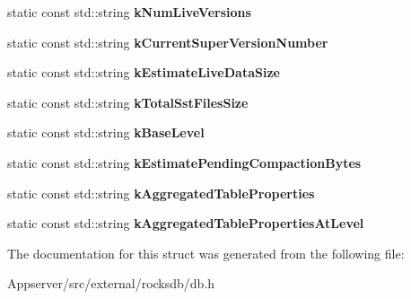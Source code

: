 \begin{DoxyCompactItemize}
\item 
static const std\+::string {\bfseries k\+Num\+Live\+Versions}\hypertarget{structrocksdb_1_1DB_1_1Properties_af9bf762044587e07ea3f48f973089a61}{}\label{structrocksdb_1_1DB_1_1Properties_af9bf762044587e07ea3f48f973089a61}

\item 
static const std\+::string {\bfseries k\+Current\+Super\+Version\+Number}\hypertarget{structrocksdb_1_1DB_1_1Properties_a11d95a8c34935217a56ba81daa015b16}{}\label{structrocksdb_1_1DB_1_1Properties_a11d95a8c34935217a56ba81daa015b16}

\item 
static const std\+::string {\bfseries k\+Estimate\+Live\+Data\+Size}\hypertarget{structrocksdb_1_1DB_1_1Properties_a891ba40a43771067adea93591d3bed46}{}\label{structrocksdb_1_1DB_1_1Properties_a891ba40a43771067adea93591d3bed46}

\item 
static const std\+::string {\bfseries k\+Total\+Sst\+Files\+Size}\hypertarget{structrocksdb_1_1DB_1_1Properties_a1754317492b469699a2aec849791aaab}{}\label{structrocksdb_1_1DB_1_1Properties_a1754317492b469699a2aec849791aaab}

\item 
static const std\+::string {\bfseries k\+Base\+Level}\hypertarget{structrocksdb_1_1DB_1_1Properties_a5168fb4704c9615855f00e278bcc4f41}{}\label{structrocksdb_1_1DB_1_1Properties_a5168fb4704c9615855f00e278bcc4f41}

\item 
static const std\+::string {\bfseries k\+Estimate\+Pending\+Compaction\+Bytes}\hypertarget{structrocksdb_1_1DB_1_1Properties_a3e0f31b77f9d37912725af7e1c22b2bf}{}\label{structrocksdb_1_1DB_1_1Properties_a3e0f31b77f9d37912725af7e1c22b2bf}

\item 
static const std\+::string {\bfseries k\+Aggregated\+Table\+Properties}\hypertarget{structrocksdb_1_1DB_1_1Properties_ab431ed4ab2413b32f09a2511fd8d25a7}{}\label{structrocksdb_1_1DB_1_1Properties_ab431ed4ab2413b32f09a2511fd8d25a7}

\item 
static const std\+::string {\bfseries k\+Aggregated\+Table\+Properties\+At\+Level}\hypertarget{structrocksdb_1_1DB_1_1Properties_a851d4c3de94417af2e9a1c0a59716abe}{}\label{structrocksdb_1_1DB_1_1Properties_a851d4c3de94417af2e9a1c0a59716abe}

\end{DoxyCompactItemize}


The documentation for this struct was generated from the following file\+:\begin{DoxyCompactItemize}
\item 
Appserver/src/external/rocksdb/db.\+h\end{DoxyCompactItemize}
